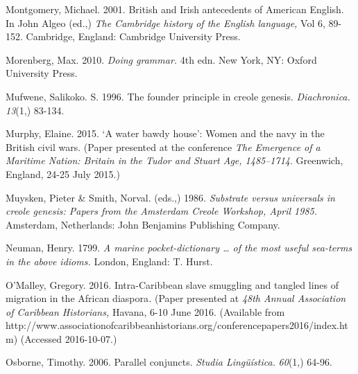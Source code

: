 \begin{styleStandard}
Montgomery, Michael. 2001. British and Irish antecedents of American English. In John Algeo (ed.,) \textit{The Cambridge history of the English language, }Vol 6, 89-152. Cambridge, England: Cambridge University Press.
\end{styleStandard}


\begin{styleStandard}
Morenberg, Max. 2010. \textit{Doing grammar.} 4th edn. New York, NY: Oxford University Press.
\end{styleStandard}


\begin{styleStandard}
Mufwene, Salikoko. S. 1996. The founder principle in creole genesis. \textit{Diachronica. 13}(1,) 83{}-134.
\end{styleStandard}


\begin{styleStandard}
Murphy, Elaine. 2015. ‘A water bawdy house’: Women and the navy in the British civil wars. (Paper presented at the conference \textit{The Emergence of a Maritime Nation: Britain in the Tudor and Stuart Age, 1485–1714}. Greenwich, England, 24-25 July 2015.)
\end{styleStandard}


\begin{styleStandard}
Muysken, Pieter \& Smith, Norval. (eds.,) 1986. \textit{Substrate versus universals in creole genesis: Papers from the Amsterdam Creole Workshop, April 1985. }Amsterdam, Netherlands: John Benjamins Publishing Company.
\end{styleStandard}


\begin{styleStandard}
Neuman, Henry. 1799. \textit{A marine pocket-dictionary … of the most useful sea-terms in the above idioms.} London, England: T. Hurst.
\end{styleStandard}


\begin{styleStandard}
O’Malley, Gregory. 2016. Intra-Caribbean slave smuggling and tangled lines of migration in the African diaspora\textit{. }(Paper presented at \textit{48th Annual Association of Caribbean Historians,} Havana, 6-10 June 2016. (Available from http://www.associationofcaribbeanhistorians.org/conferencepapers2016/index.htm) (Accessed 2016-10-07.)
\end{styleStandard}


\begin{styleStandard}
Osborne, Timothy. 2006. Parallel conjuncts. \textit{Studia Lingüística.} \textit{60}(1,) 64-96. 
\end{styleStandard}


